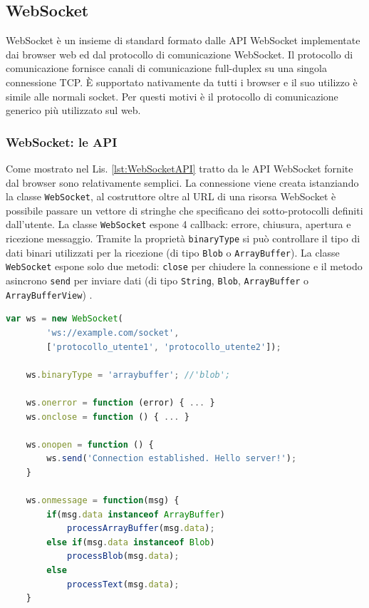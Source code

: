 \subsection{WebSocket}
WebSocket è un insieme di standard formato dalle API WebSocket implementate dai browser web ed dal protocollo di comunicazione WebSocket. Il protocollo di comunicazione fornisce canali di comunicazione full-duplex su una singola connessione TCP. È supportato nativamente da tutti i browser e il suo utilizzo è simile alle normali socket. Per questi motivi è il protocollo di comunicazione generico più utilizzato sul web.

\subsubsection{WebSocket: le API}
Come mostrato nel Lis. \ref{lst:WebSocketAPI} tratto da \parencite{High_Performance_Browser_Networking} le API WebSocket fornite dal browser sono relativamente semplici. La connessione viene creata istanziando la classe \verb|WebSocket|, al costruttore oltre al URL di una risorsa WebSocket è possibile passare un vettore di stringhe che specificano dei sotto-protocolli definiti dall'utente. La classe \verb|WebSocket| espone 4 callback: errore, chiusura, apertura e ricezione messaggio. Tramite la proprietà \verb|binaryType| si può controllare il tipo di dati binari utilizzati per la ricezione (di tipo \verb|Blob| o \verb|ArrayBuffer|). La classe \verb|WebSocket| espone solo due metodi: \verb|close| per chiudere la connessione e il metodo asincrono \verb|send| per inviare dati (di tipo \verb|String|, \verb|Blob|, \verb|ArrayBuffer| o \verb|ArrayBufferView|) \parencite{WebSocket_Web_APIs}.

\begin{lstlisting}[language=JavaScript, caption=Esempio di codice delle API WebSocket, label={lst:WebSocketAPI}]
	var ws = new WebSocket(
		'ws://example.com/socket', 
		['protocollo_utente1', 'protocollo_utente2']); 

	ws.binaryType = 'arraybuffer'; //'blob';

	ws.onerror = function (error) { ... } 
	ws.onclose = function () { ... } 

	ws.onopen = function () { 
		ws.send('Connection established. Hello server!'); 
	}

	ws.onmessage = function(msg) { 
		if(msg.data instanceof ArrayBuffer)
			processArrayBuffer(msg.data);
		else if(msg.data instanceof Blob)
			processBlob(msg.data);
		else
			processText(msg.data);	
	}
\end{lstlisting}

